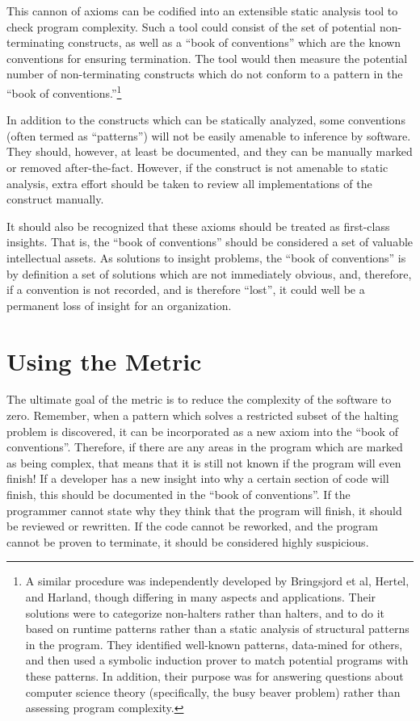 This cannon of axioms can be codified into an extensible static analysis tool to check program complexity.  Such a tool could consist of the set of potential non-terminating constructs, as well as a ``book of conventions'' which are the known conventions for ensuring termination.  The tool would then measure the potential number of non-terminating constructs which do not conform to a pattern in the ``book of conventions.''\footnote{A similar procedure was independently developed by Bringsjord et al\cite{bringsjord}, Hertel\cite{hertel}, and Harland\cite{harland}, though differing in many aspects and applications.  Their solutions were to categorize non-halters rather than halters, and to do it based on runtime patterns rather than a static analysis of structural patterns in the program.  They identified well-known patterns, data-mined for others, and then used a symbolic induction prover to match potential programs with these patterns. In addition, their purpose was for answering questions about computer science theory (specifically, the busy beaver problem) rather than assessing program complexity.}

In addition to the constructs which can be statically analyzed, some conventions (often termed as ``patterns'') will not be easily amenable to inference by software.  They should, however, at least be documented, and they can be manually marked or removed after-the-fact.  However, if the construct is not amenable to static analysis, extra effort should be taken to review all implementations of the construct manually.

It should also be recognized that these axioms should be treated as first-class insights.  That is, the ``book of conventions'' should be considered a set of valuable intellectual assets.  As solutions to insight problems, the ``book of conventions'' is by definition a set of solutions which are not immediately obvious, and, therefore, if a convention is not recorded, and is therefore ``lost'', it could well be a permanent loss of insight for an organization.

\section{Using the Metric}

The ultimate goal of the metric is to reduce the complexity of the software to zero.  Remember, when a pattern which solves a restricted subset of the halting problem is discovered, it can be incorporated as a new axiom into the ``book of conventions''.  Therefore, if there are any areas in the program which are marked as being complex, that means that it is still not known if the program will even finish!  If a developer has a new insight into why a certain section of code will finish, this should be documented in the ``book of conventions''.  If the programmer cannot state why they think that the program will finish, it should be reviewed or rewritten.  If the code cannot be reworked, and the program cannot be proven to terminate, it should be considered highly suspicious.

